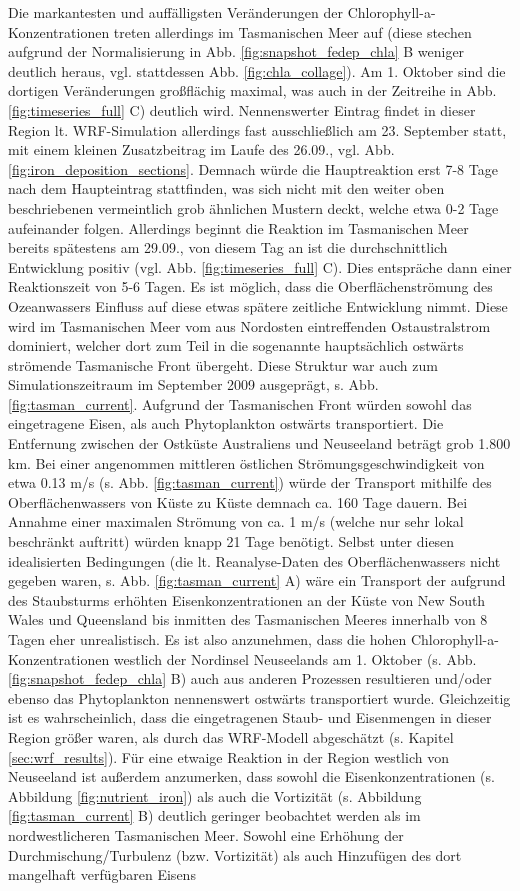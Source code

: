 \documentclass[12pt,a4paper,onecolumn]{scrartcl}
\begin{document}
Die markantesten und auffälligsten Veränderungen der Chlorophyll-a-Konzentrationen treten allerdings im Tasmanischen Meer auf (diese stechen aufgrund der Normalisierung in Abb. \ref{fig:snapshot_fedep_chla} B weniger deutlich heraus, vgl. stattdessen Abb. \ref{fig:chla_collage}). Am 1. Oktober sind die dortigen Veränderungen großflächig maximal, was auch in der Zeitreihe in Abb. \ref{fig:timeseries_full} C) deutlich wird. Nennenswerter Eintrag findet in dieser Region lt. WRF-Simulation allerdings fast ausschließlich am 23. September statt, mit einem kleinen Zusatzbeitrag im Laufe des 26.09., vgl. Abb. \ref{fig:iron_deposition_sections}. Demnach würde die Hauptreaktion erst 7-8 Tage nach dem Haupteintrag stattfinden, was sich nicht mit den weiter oben beschriebenen vermeintlich grob ähnlichen Mustern deckt, welche etwa 0-2 Tage aufeinander folgen. Allerdings beginnt die Reaktion im Tasmanischen Meer bereits spätestens am 29.09., von diesem Tag an ist die durchschnittlich Entwicklung positiv (vgl. Abb. \ref{fig:timeseries_full} C). Dies entspräche dann einer Reaktionszeit von 5-6 Tagen. Es ist möglich, dass die Oberflächenströmung des Ozeanwassers Einfluss auf diese etwas spätere zeitliche Entwicklung nimmt. Diese wird im Tasmanischen Meer vom aus Nordosten eintreffenden Ostaustralstrom dominiert, welcher dort zum Teil in die sogenannte hauptsächlich ostwärts strömende Tasmanische Front übergeht. Diese Struktur war auch zum Simulationszeitraum im September 2009 ausgeprägt, s. Abb. \ref{fig:tasman_current}. Aufgrund der Tasmanischen Front würden sowohl das eingetragene Eisen, als auch Phytoplankton ostwärts transportiert. Die Entfernung zwischen der Ostküste Australiens und Neuseeland beträgt grob 1.800 km. Bei einer angenommen mittleren östlichen Strömungsgeschwindigkeit von etwa 0.13 m/s (s. Abb. \ref{fig:tasman_current}) würde der Transport mithilfe des Oberflächenwassers von Küste zu Küste demnach ca. 160 Tage dauern. Bei Annahme einer maximalen Strömung von ca. 1 m/s (welche nur sehr lokal beschränkt auftritt) würden knapp 21 Tage benötigt. Selbst unter diesen idealisierten Bedingungen (die lt. Reanalyse-Daten des Oberflächenwassers nicht gegeben waren, s. Abb. \ref{fig:tasman_current} A) wäre ein Transport der aufgrund des Staubsturms erhöhten Eisenkonzentrationen an der Küste von New South Wales und Queensland bis inmitten des Tasmanischen Meeres innerhalb von 8 Tagen eher unrealistisch. Es ist also anzunehmen, dass die hohen Chlorophyll-a-Konzentrationen westlich der Nordinsel Neuseelands am 1. Oktober (s. Abb. \ref{fig:snapshot_fedep_chla} B) auch aus anderen Prozessen resultieren und/oder ebenso das Phytoplankton nennenswert ostwärts transportiert wurde. Gleichzeitig ist es wahrscheinlich, dass die eingetragenen Staub- und Eisenmengen in dieser Region größer waren, als durch das WRF-Modell abgeschätzt (s. Kapitel \ref{sec:wrf_results}). Für eine etwaige Reaktion in der Region westlich von Neuseeland ist außerdem anzumerken, dass sowohl die Eisenkonzentrationen (s. Abbildung \ref{fig:nutrient_iron}) als auch die Vortizität (s. Abbildung \ref{fig:tasman_current} B) deutlich geringer beobachtet werden als im nordwestlicheren Tasmanischen Meer. Sowohl eine Erhöhung der Durchmischung/Turbulenz (bzw. Vortizität) als auch Hinzufügen des dort mangelhaft verfügbaren Eisens 
\end{document}

